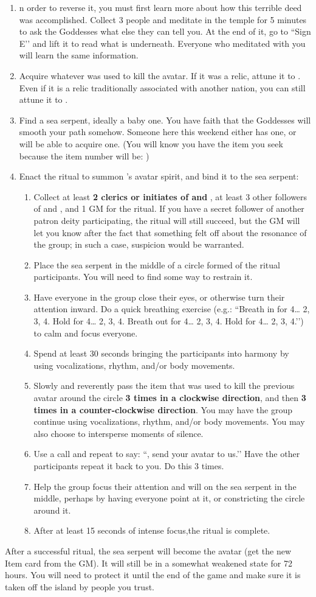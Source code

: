 \documentclass[green]{GL2020}
\begin{document}
\begin{enumerate}
  \item n order to reverse it, you must first learn more about how this terrible deed was accomplished. Collect 3 people and meditate in the temple for 5 minutes to ask the Goddesses what else they can tell you. At the end of it, go to ``Sign E’’ and lift it to read what is underneath. Everyone who meditated with you will learn the same information.
  \item Acquire whatever was used to kill the \cEbb{} avatar. If it was a relic, attune it to \pShip{}. Even if it is a relic traditionally associated with another nation, you can still attune it to \pShip{}.
  \item Find a sea serpent, ideally a baby one. You have faith that the Goddesses will smooth your path somehow. Someone here this weekend either has one, or will be able to acquire one. (You will know you have the item you seek because the item number will be: \iBabySeaSerpent{\MYnumber})
  \item Enact the ritual to summon \cEbb{}’s avatar spirit, and bind it to the sea serpent:
  \begin{enumerate}
    \item Collect at least \textbf{2 clerics or initiates of \cEbb{} and \cFlow{}}, at least 3 other followers of \cEbb{} and \cFlow{}, and 1 GM for the ritual. If you have a secret follower of another patron deity participating, the ritual will still succeed, but the GM will let you know after the fact that something felt off about the resonance of the group; in such a case, suspicion would be warranted. 
    \item Place the sea serpent in the middle of a circle formed of the ritual participants. You will need to find some way to restrain it.
    \item Have everyone in the group close their eyes, or otherwise turn their attention inward. Do a quick breathing exercise (e.g.: ``Breath in for 4… 2, 3, 4. Hold for 4… 2, 3, 4. Breath out for 4… 2, 3, 4. Hold for 4… 2, 3, 4.’’) to calm and focus everyone.
    \item Spend at least 30 seconds bringing the participants into harmony by using vocalizations, rhythm, and/or body movements.
    \item Slowly and reverently pass the item that was used to kill the previous avatar around the circle \textbf{3 times in a clockwise direction}, and then \textbf{3 times in a counter-clockwise direction}. You may have the group continue using vocalizations, rhythm, and/or body movements. You may also choose to intersperse moments of silence.
    \item Use a call and repeat to say: ``\cEbb{\full}, send your avatar to us.’’ Have the other participants repeat it back to you. Do this 3 times.
    \item Help the group focus their attention and will on the sea serpent in the middle, perhaps by having everyone point at it, or constricting the circle around it.
    \item After at least 15 seconds of intense focus,the ritual is complete.
  \end{enumerate}
\end{enumerate}

After a successful ritual, the sea serpent will become the \cEbb{} avatar (get the new Item card from the GM). It will still be in a somewhat weakened state for 72 hours. You will need to protect it until the end of the game and make sure it is taken off the island by people you trust.
\end{document}
